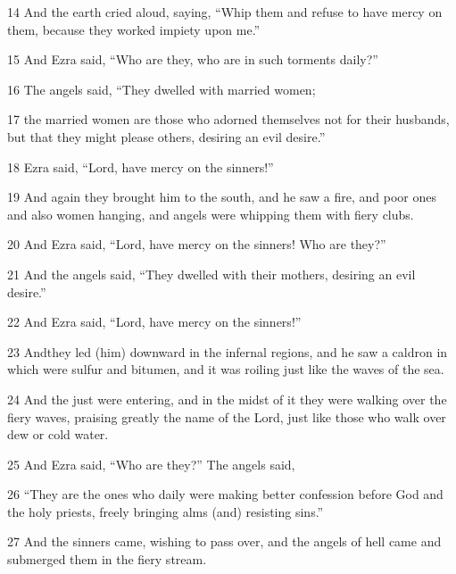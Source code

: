 \par 14 And the earth cried aloud, saying, “Whip them and refuse to have mercy on them, because they worked impiety upon me.”

\par 15 And Ezra said, “Who are they, who are in such torments daily?”

\par 16 The angels said, “They dwelled with married women;

\par 17 the married women are those who adorned themselves not for their husbands, but that they might please others, desiring an evil desire.”

\par 18 Ezra said, “Lord, have mercy on the sinners!”

\par 19 And again they brought him to the south, and he saw a fire, and poor ones and also women hanging, and angels were whipping them with fiery clubs.

\par 20 And Ezra said, “Lord, have mercy on the sinners! Who are they?”

\par 21 And the angels said, “They dwelled with their mothers, desiring an evil desire.”

\par 22 And Ezra said, “Lord, have mercy on the sinners!”

\par 23 Andthey led (him) downward in the infernal regions, and he saw a caldron in which were sulfur and bitumen, and it was roiling just like the waves of the sea.

\par 24 And the just were entering, and in the midst of it they were walking over the fiery waves, praising greatly the name of the Lord, just like those who walk over dew or cold water.

\par 25 And Ezra said, “Who are they?” The angels said,

\par 26 “They are the ones who daily were making better confession before God and the holy priests, freely bringing alms (and) resisting sins.”

\par 27 And the sinners came, wishing to pass over, and the angels of hell came and submerged them in the fiery stream.

